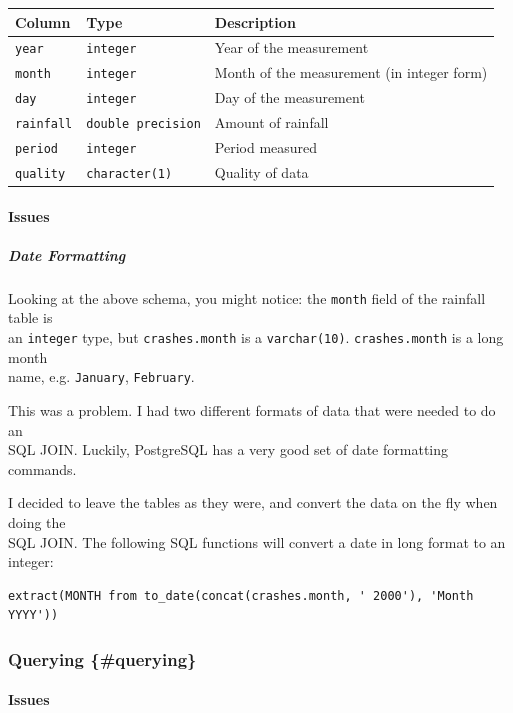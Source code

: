 \documentclass{article}
\begin{document}
\begin{longtable}[]{@{}lll@{}}
\toprule
Column & Type & Description\tabularnewline
\midrule
\endhead
\texttt{year} & \texttt{integer} & Year of the
measurement\tabularnewline
\texttt{month} & \texttt{integer} & Month of the measurement (in integer
form)\tabularnewline
\texttt{day} & \texttt{integer} & Day of the measurement\tabularnewline
\texttt{rainfall} & \texttt{double\ precision} & Amount of
rainfall\tabularnewline
\texttt{period} & \texttt{integer} & Period measured\tabularnewline
\texttt{quality} & \texttt{character(1)} & Quality of
data\tabularnewline
\bottomrule
\end{longtable}

\paragraph{Issues}\label{issues}

\subparagraph{Date Formatting}\label{date-formatting}

Looking at the above schema, you might notice: the \texttt{month} field
of the rainfall table is\\
an \texttt{integer} type, but \texttt{crashes.month} is a
\texttt{varchar(10)}. \texttt{crashes.month} is a long month\\
name, e.g. \texttt{January}, \texttt{February}.

This was a problem. I had two different formats of data that were needed
to do an\\
SQL JOIN. Luckily, PostgreSQL has a very good set of date formatting
commands.

I decided to leave the tables as they were, and convert the data on the
fly when doing the\\
SQL JOIN. The following SQL functions will convert a date in long format
to an integer:

\begin{verbatim}
extract(MONTH from to_date(concat(crashes.month, ' 2000'), 'Month YYYY'))
\end{verbatim}

\subsubsection{Querying \{\#querying\}}\label{querying-querying}

\paragraph{Issues}\label{issues-1}
\end{document}
